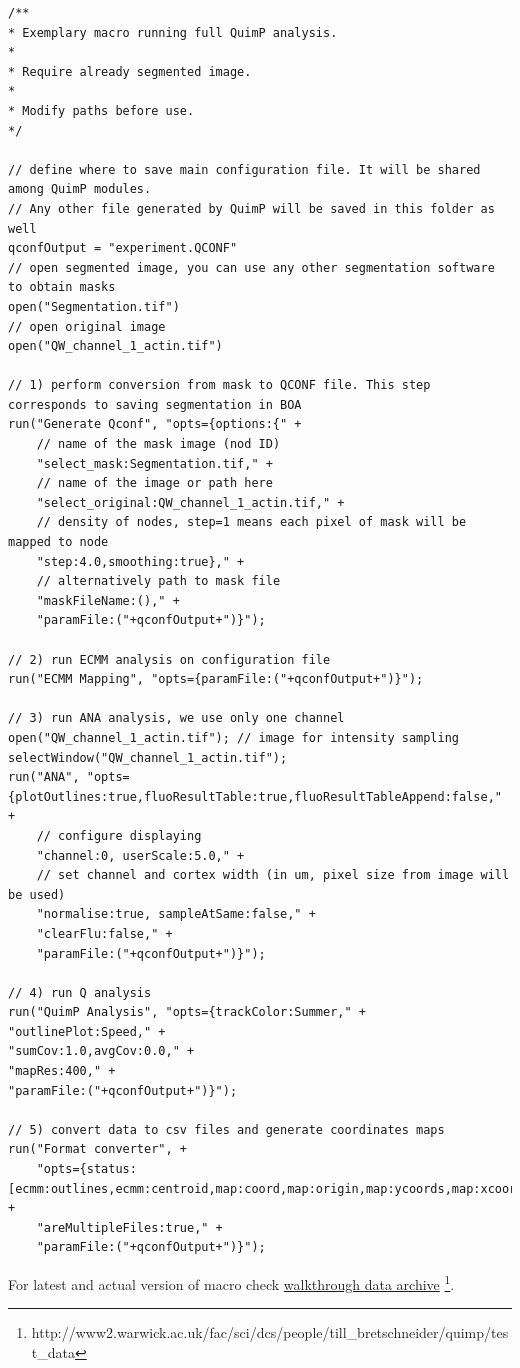 \documentclass[a4paper,12pt]{article}
\begin{document}
\begin{lstlisting}[]
/**
* Exemplary macro running full QuimP analysis.
* 
* Require already segmented image.
* 
* Modify paths before use.
*/

// define where to save main configuration file. It will be shared among QuimP modules.
// Any other file generated by QuimP will be saved in this folder as well
qconfOutput = "experiment.QCONF"
// open segmented image, you can use any other segmentation software to obtain masks
open("Segmentation.tif")
// open original image
open("QW_channel_1_actin.tif")

// 1) perform conversion from mask to QCONF file. This step corresponds to saving segmentation in BOA 
run("Generate Qconf", "opts={options:{" +
	// name of the mask image (nod ID)
	"select_mask:Segmentation.tif," +	
	// name of the image or path here
	"select_original:QW_channel_1_actin.tif," + 
	// density of nodes, step=1 means each pixel of mask will be mapped to node
	"step:4.0,smoothing:true}," +	
	// alternatively path to mask file
	"maskFileName:()," +				
	"paramFile:("+qconfOutput+")}");

// 2) run ECMM analysis on configuration file
run("ECMM Mapping", "opts={paramFile:("+qconfOutput+")}");

// 3) run ANA analysis, we use only one channel
open("QW_channel_1_actin.tif"); // image for intensity sampling
selectWindow("QW_channel_1_actin.tif");
run("ANA", "opts={plotOutlines:true,fluoResultTable:true,fluoResultTableAppend:false," + 
	// configure displaying
	"channel:0, userScale:5.0," + 
	// set channel and cortex width (in um, pixel size from image will be used)
	"normalise:true, sampleAtSame:false," +
	"clearFlu:false," +
	"paramFile:("+qconfOutput+")}");

// 4) run Q analysis
run("QuimP Analysis", "opts={trackColor:Summer," +
"outlinePlot:Speed," +
"sumCov:1.0,avgCov:0.0," +
"mapRes:400," +
"paramFile:("+qconfOutput+")}");

// 5) convert data to csv files	and generate coordinates maps	
run("Format converter", +
	"opts={status:[ecmm:outlines,ecmm:centroid,map:coord,map:origin,map:ycoords,map:xcoords]," +
	"areMultipleFiles:true," +
	"paramFile:("+qconfOutput+")}");
\end{lstlisting}

For latest and actual version of macro check \href{http://www2.warwick.ac.uk/fac/sci/dcs/people/till\_bretschneider/quimp/test\_data}{walkthrough data archive} \footnote{http://www2.warwick.ac.uk/fac/sci/dcs/people/till\_bretschneider/quimp/test\_data}.
\end{document}
